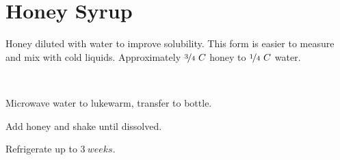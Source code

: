\section{Honey Syrup}


\begin{recipestats}[
	servings=$\approx~1~Cup$,
	preptime=5~\minute,
	source=Mike \& Jane,
	original=\citefield{cocktailSeminars2021}{title} \cite{cocktailSeminars2021},
]
\end{recipestats}


\begin{recipeabstract}
	Honey diluted with water to improve solubility.
	This form is easier to measure and mix with cold liquids.
	Approximately $\nicefrac{3}{4}~C$ honey to $\nicefrac{1}{4}~C$ water.
\end{recipeabstract}


\begin{ingredientcolumns}[1]
	\begin{ingredientblock}
		\\
	\end{ingredientblock}
\end{ingredientcolumns}


\begin{preparation}
\item Microwave water to lukewarm, transfer to bottle.
\item Add honey and shake until dissolved.
\item Refrigerate up to $3~weeks$.
\end{preparation}


\recipeend
